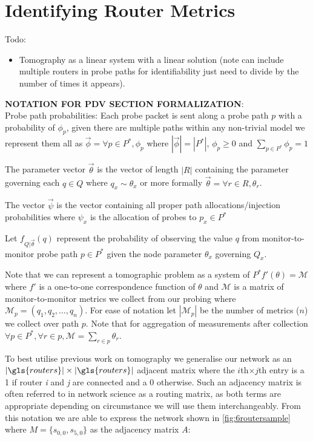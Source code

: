     
\section{Identifying Router Metrics}
\label{sec:Maddtomography}
Todo:
\begin{itemize}
    \item Tomography as a linear system with a linear solution (note can include multiple routers in probe paths for identifiability just need to divide by the number of times it appears).
\end{itemize}

    \begin{mdframed}
    \textbf{NOTATION FOR PDV SECTION FORMALIZATION}:\\
    Probe path probabilities: Each probe packet is sent along a probe path $p$ with a probability of $\phi_p$, given there are multiple paths within any non-trivial model we represent them all as $\vec{\phi}=\forall p\in P^*, \phi_p$ where $|\vec{\phi}|=|P^*|$, $\phi_p \geq 0$ and $\sum_{p\in P^*}\phi_p = 1$
    
    The parameter vector $\vec{\theta}$ is the vector of length $|R|$ containing the parameter governing each $q\in Q$ where $ q_x \sim \theta_x$ or more formally $\vec{\theta}=\forall r\in R, \theta_r$.
    
    The vector $\vec{\psi}$ is the vector containing all proper path allocations/injection probabilities where $\psi_x$ is the allocation of probes to $p_x\in P^*$ 
    
    Let $f_{Q|\vec{\theta}}(q)$ represent the probability of observing the value $q$ from monitor-to-monitor probe path $p\in P^*$ given the node parameter $\theta_x$ governing $Q_x$.
    
    Note that we can represent a tomographic problem as a system of $P^*f'(\theta)=\mathcal{M}$ where $f'$ is a one-to-one correspondence function of $\theta$ and $\mathcal{M}$ is a matrix of monitor-to-monitor metrics we collect from our probing where $\mathcal{M}_p = (q_1,q_2,\ldots, q_n)$. For ease of notation let $|\mathcal{M}_p|$ be the number of metrics ($n$) we collect over path $p$. Note that for aggregation of measurements after collection $\forall p\in P^*, \forall r\in p, \mathcal{M}=\sum_{r\in p}\theta_r$.
    \end{mdframed}

    To best utilise previous work on tomography we generalise our network as an $|\gls{routers}|\times|\gls{routers}|$ adjacent matrix where the $i$th$\times j$th entry is a 1 if router \emph{i} and \emph{j} are connected and a 0 otherwise. Such an adjacency matrix is often referred to in network science as a routing matrix, as both terms are appropriate depending on circumstance we will use them interchangeably. From this notation we are able to express the network shown in \cref{fig:6routersample} where $M=\{s_{0,0},s_{5,0}\}$ as the adjacency matrix $A$:
    
